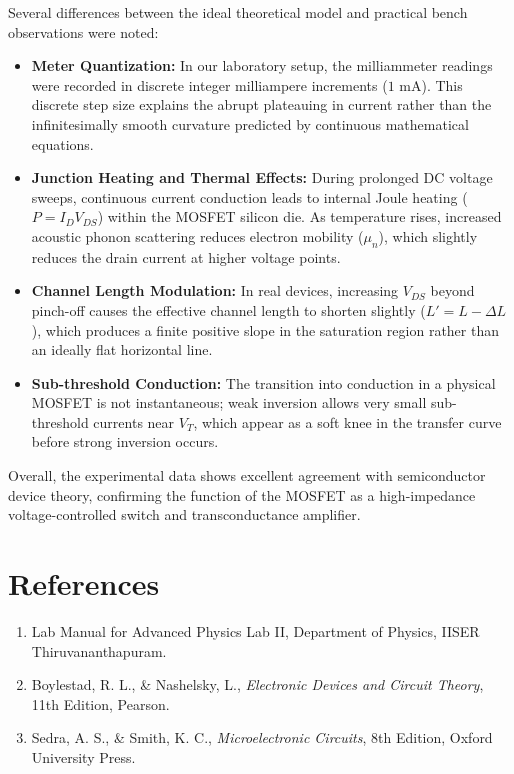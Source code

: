 \documentclass[12pt,a4paper]{article}
\begin{document}
Several differences between the ideal theoretical model and practical bench observations were noted:
\begin{itemize}
    \item \textbf{Meter Quantization:} In our laboratory setup, the milliammeter readings were recorded in discrete integer milliampere increments ($1\text{ mA}$). This discrete step size explains the abrupt plateauing in current rather than the infinitesimally smooth curvature predicted by continuous mathematical equations.
    \item \textbf{Junction Heating and Thermal Effects:} During prolonged DC voltage sweeps, continuous current conduction leads to internal Joule heating ($P = I_D V_{DS}$) within the MOSFET silicon die. As temperature rises, increased acoustic phonon scattering reduces electron mobility ($\mu_n$), which slightly reduces the drain current at higher voltage points.
    \item \textbf{Channel Length Modulation:} In real devices, increasing $V_{DS}$ beyond pinch-off causes the effective channel length to shorten slightly ($L' = L - \Delta L$), which produces a finite positive slope in the saturation region rather than an ideally flat horizontal line.
    \item \textbf{Sub-threshold Conduction:} The transition into conduction in a physical MOSFET is not instantaneous; weak inversion allows very small sub-threshold currents near $V_T$, which appear as a soft knee in the transfer curve before strong inversion occurs.
\end{itemize}

Overall, the experimental data shows excellent agreement with semiconductor device theory, confirming the function of the MOSFET as a high-impedance voltage-controlled switch and transconductance amplifier.

\section{References}
\begin{enumerate}
    \item Lab Manual for Advanced Physics Lab II, Department of Physics, IISER Thiruvananthapuram.
    \item Boylestad, R. L., \& Nashelsky, L., \textit{Electronic Devices and Circuit Theory}, 11th Edition, Pearson.
    \item Sedra, A. S., \& Smith, K. C., \textit{Microelectronic Circuits}, 8th Edition, Oxford University Press.
\end{enumerate}
\end{document}
